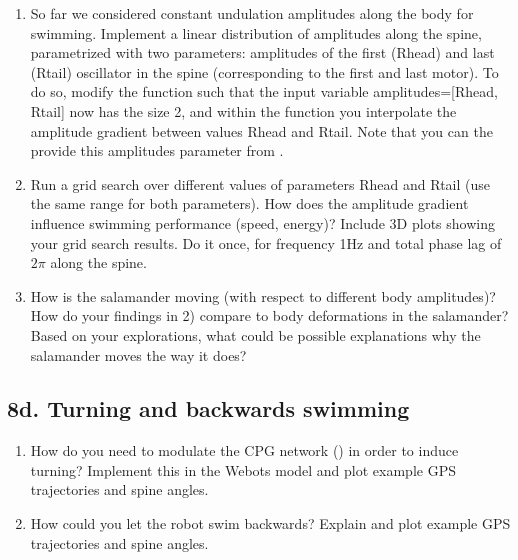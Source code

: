 \documentclass{cmc}
\begin{document}
\begin{enumerate}
\item So far we considered constant undulation amplitudes along the body for
  swimming. Implement a linear distribution of amplitudes along the spine,
  parametrized with two parameters: amplitudes of the first (Rhead) and last
  (Rtail) oscillator in the spine (corresponding to the first and last
  motor). To do so, modify the function
   such that the input
  variable amplitudes=[Rhead, Rtail] now has the size 2, and within the function
  you interpolate the amplitude gradient between values Rhead and Rtail. Note
  that you can the provide this amplitudes parameter from
  .
\item Run a grid search over different values of parameters Rhead and Rtail (use
  the same range for both parameters). How does the amplitude gradient influence
  swimming performance (speed, energy)? Include 3D plots showing your grid
  search results. Do it once, for frequency 1Hz and total phase lag of $2\pi$
  along the spine.
\item How is the salamander moving (with respect to different body amplitudes)?
  How do your findings in 2) compare to body deformations in the salamander?
  Based on your explorations, what could be possible explanations why the
  salamander moves the way it does?
\end{enumerate}


\subsection*{8d. Turning and backwards swimming}
\label{sec:turning-backwards}

\begin{enumerate}
\item How do you need to modulate the CPG network () in order
  to induce turning?  Implement this in the Webots model and plot example GPS
  trajectories and spine angles.
\item How could you let the robot swim backwards? Explain and plot example GPS
  trajectories and spine angles.
\end{enumerate}




\label{sec:references}




\end{document}
